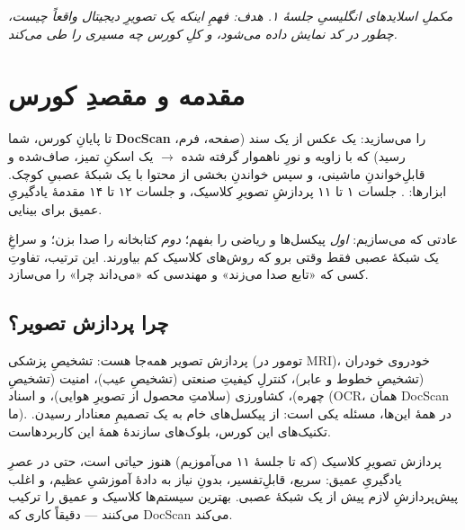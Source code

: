 \documentclass[12pt,a4paper]{article}
\begin{document}

{\small\itshape مکملِ اسلایدهای انگلیسیِ جلسهٔ ۱. هدف: فهمِ اینکه یک تصویرِ دیجیتال واقعاً چیست، چطور در کد نمایش داده می‌شود، و کلِ کورس چه مسیری را طی می‌کند.}

\vspace{0.5cm}
\tableofcontents
\vspace{1cm}

\section{مقدمه و مقصدِ کورس}

تا پایانِ کورس، شما \textbf{DocScan} را می‌سازید: یک عکس از یک سند (صفحه، فرم، رسید) که با زاویه
و نورِ ناهموار گرفته شده $\rightarrow$ یک اسکنِ تمیز، صاف‌شده و قابلِ‌خواندنِ ماشینی، و سپس خواندنِ
بخشی از محتوا با یک شبکهٔ عصبیِ کوچک. ابزارها: . جلسات ۱ تا ۱۱
پردازشِ تصویرِ کلاسیک، و جلسات ۱۲ تا ۱۴ مقدمهٔ یادگیریِ عمیق برای بینایی.

\begin{nokte}
عادتی که می‌سازیم: \emph{اول} پیکسل‌ها و ریاضی را بفهم؛ \emph{دوم} کتابخانه را صدا بزن؛ و سراغِ
یک شبکهٔ عصبی فقط وقتی برو که روش‌های کلاسیک کم بیاورند. این ترتیب، تفاوتِ کسی که «تابع صدا
می‌زند» و مهندسی که «می‌داند چرا» را می‌سازد.
\end{nokte}

\subsection{چرا پردازش تصویر؟}

پردازش تصویر همه‌جا هست: تشخیصِ پزشکی (تومور در MRI)، خودروی خودران (تشخیصِ خطوط و عابر)،
کنترلِ کیفیتِ صنعتی (تشخیصِ عیب)، امنیت (تشخیصِ چهره)، کشاورزی (سلامتِ محصول از تصویرِ هوایی)،
و اسناد (OCR، همان DocScanِ ما). در همهٔ این‌ها، مسئله یکی است: از پیکسل‌های خام به یک تصمیمِ
معنادار رسیدن. تکنیک‌های این کورس، بلوک‌های سازندهٔ همهٔ این کاربردهاست.

\begin{yaddasht}
پردازش تصویرِ کلاسیک (که تا جلسهٔ ۱۱ می‌آموزیم) هنوز حیاتی است، حتی در عصرِ یادگیریِ عمیق: سریع،
قابلِ‌تفسیر، بدونِ نیاز به دادهٔ آموزشیِ عظیم، و اغلب پیش‌پردازشِ لازم پیش از یک شبکهٔ عصبی. بهترین
سیستم‌ها کلاسیک و عمیق را ترکیب می‌کنند — دقیقاً کاری که DocScan می‌کند.
\end{yaddasht}
\end{document}
